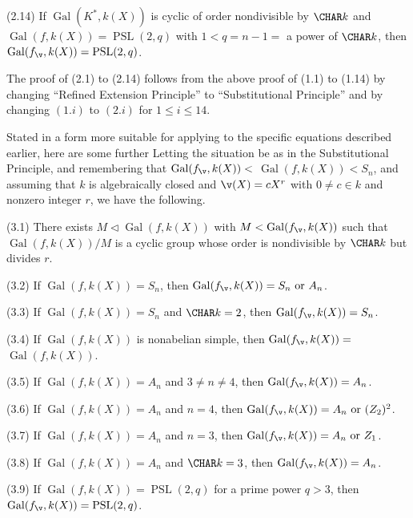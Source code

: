 {\rm(2.14)} If $\operatorname{Gal}(K^*,k(X))$ is cyclic of 
order nondivisible 
by
$\CHAR k$ 
and$\operatorname{Gal}
(f,k(X))=\operatorname{PSL}(2,q)$ with $1<q=n-1=$ a power of
$\CHAR k$, then$\operatorname{Gal}(f_{\v},k(X))=%
\operatorname{PSL}(2,q)$.
\endproclaim

The proof of (2.1) to (2.14) follows from the above proof 
of (1.1) to
(1.14) by changing ``Refined Extension Principle'' to 
``Substitutional
Principle'' and by changing $(1.i)$ to $(2.i)$ for $1\le 
i\le 14$.

Stated in a form more suitable for applying to the specific
equations described earlier, here are some further
Letting the situation be as in the Substitutional 
Principle, 
and remembering that $\operatorname{Gal}(f_{\v},k(X))<$ 
$\operatorname{Gal}(f,k(X))<S_n$, 
and assuming that $k$ is algebraically closed and 
$\v(X)=cX^r$ with 
$0\ne c\in k$ and nonzero integer $r$, we have the 
following. 

{\rm(3.1)} There exists 
$M\triangleleft\operatorname{Gal}(f,k(X))$ with 
$M<\operatorname{Gal}(f_{\v},k(X))$ such that
$\operatorname{Gal}(f,k(X))/M$ is a cyclic group whose 
order is nondivisible
by $\CHAR k$ but divides $r$. 

{\rm(3.2)} If $\operatorname{Gal}(f,k(X))=S_n$, then 
$\operatorname{Gal}(f_{\v},k(X))=S_n\text{ or }A_n$.

{\rm(3.3)} If $\operatorname{Gal}(f,k(X))=S_n$ and $\CHAR 
k =2$, then 
$\operatorname{Gal}(f_{\v},k(X))=S_n$.

{\rm(3.4)} If $\operatorname{Gal}(f,k(X))$ is  
nonabelian simple, then 
$\operatorname{Gal}(f_{\v},k(X))=$\newline
$\operatorname{Gal}(f,k(X))$.

{\rm(3.5)} If $\operatorname{Gal}(f,k(X))=A_n$ and $3\ne 
n\ne 4$, then 
$\operatorname{Gal}(f_{\v},k(X))=A_n$.

{\rm(3.6)} If $\operatorname{Gal}(f,k(X))=A_n$ and $n=4$, 
then 
$\operatorname{Gal}(f_{\v},k(X))=A_n\text{ or }(Z_2)^2$.

{\rm(3.7)} If $\operatorname{Gal}(f,k(X))=A_n$ and $n=3$, 
then 
$\operatorname{Gal}(f_{\v},k(X))=A_n\text{ or }Z_1$.

{\rm(3.8)} If $\operatorname{Gal}(f,k(X))=A_n$ and $\CHAR 
k=3$, then 
$\operatorname{Gal}(f_{\v},k(X))=A_n$.

{\rm(3.9)} If 
$\operatorname{Gal}(f,k(X))=\operatorname{PSL}(2,q)$ for a 
prime power $q>3$, 
then$\operatorname{Gal}(f_{\v},k(X))=%
\operatorname{PSL}(2,q)$.

